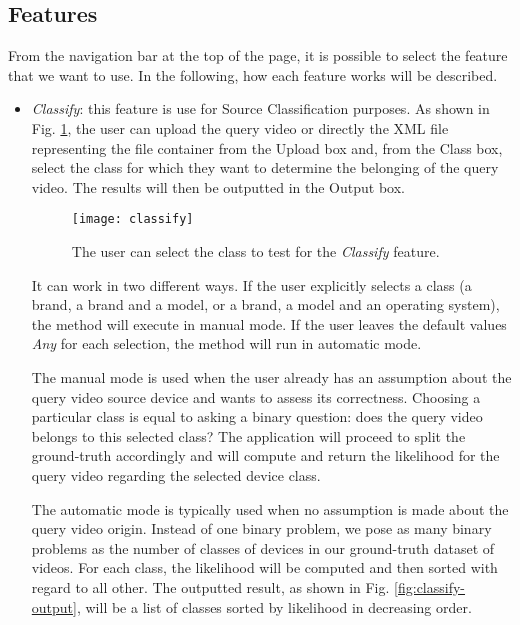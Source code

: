 \subsection{Features}

From the navigation bar at the top of the page, it is possible to select the feature that we want to use. In the following, how each feature works will be described.

\begin{itemize}

\item \emph{Classify}: this feature is use for Source Classification purposes. As shown in Fig. \ref{fig:classify}, the user can upload the query video or directly the XML file representing the file container from the Upload box and, from the Class box, select the class for which they want to determine the belonging of the query video. The results will then be outputted in the Output box. 

\begin{figure}
  \centering
  \texttt{[image: classify]}
  \caption{The user can select the class to test for the \emph{Classify} feature.}\label{fig:classify}
\end{figure}

It can work in two different ways. If the user explicitly selects a class (a brand, a brand and a model, or a brand, a model and an operating system), the method will execute in manual mode. If the user leaves the default values \emph{Any} for each selection, the method will run in automatic mode.

The manual mode is used when the user already has an assumption about the query video source device and wants to assess its correctness. Choosing a particular class is equal to asking a binary question: does the query video belongs to this selected class? The application will proceed to split the ground-truth accordingly and will compute and return the likelihood for the query video regarding the selected device class.

The automatic mode is typically used when no assumption is made about the query video origin. Instead of one binary problem, we pose as many binary problems as the number of classes of devices in our ground-truth dataset of videos. For each class, the likelihood will be computed and then sorted with regard to all other. The outputted result, as shown in Fig. \ref{fig:classify-output}, will be a list of classes sorted by likelihood in decreasing order.


\end{itemize}
